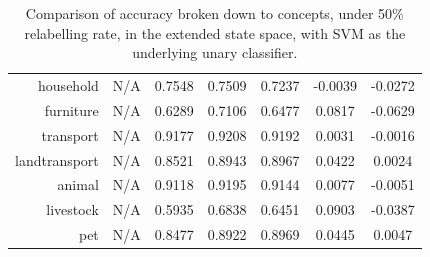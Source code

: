 \documentclass[11pt,a4paper]{article}
\begin{document}
\begin{table}[htbp]
\begin{tabular}{r|c|c|c|c|c|c}
household     & N/A    & 0.7548 & 0.7509 & 0.7237 & -0.0039 & -0.0272\\
furniture     & N/A    & 0.6289 & 0.7106 & 0.6477 & 0.0817 & -0.0629\\
transport     & N/A    & 0.9177 & 0.9208 & 0.9192 & 0.0031 & -0.0016\\
landtransport & N/A    & 0.8521 & 0.8943 & 0.8967 & 0.0422 & 0.0024\\
animal        & N/A    & 0.9118 & 0.9195 & 0.9144 & 0.0077 & -0.0051\\
livestock     & N/A    & 0.5935 & 0.6838 & 0.6451 & 0.0903 & -0.0387\\
pet           & N/A    & 0.8477 & 0.8922 & 0.8969 & 0.0445 & 0.0047
\end{tabular}
\caption{Comparison of accuracy broken down to concepts, under 50\% relabelling rate, in the extended state space, with SVM as the underlying unary classifier.}
\label{tab:svm50acc}
\end{table}
\end{document}
